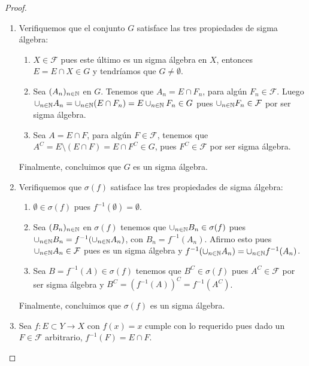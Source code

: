 \begin{proof}
  \begin{enumerate}
    \item Verifiquemos que el conjunto $G$ satisface las tres propiedades de sigma \'algebra:
      \begin{enumerate}
        \item $X \in \mathcal{F}$ pues este \'ultimo es un sigma \'algebra en $X$, entonces $E = E \cap X \in G$ y tendr\'iamos que $G \neq \emptyset$.
        \item Sea $(A_n)_{n \in \mathbb N}$ en $G$. Tenemos que $A_n = E \cap F_n$, para alg\'un $F_n \in \mathcal{F}$. Luego $\cup_{n \in \mathbb N} A_n = \cup_{n \in \mathbb N} (E \cap F_n) = E \cup_{n \in \mathbb N} F_n \in G$ pues $\cup_{n \in \mathbb N} F_n \in \mathcal{F}$ por ser sigma \'algebra.
        \item Sea $A = E \cap F$, para alg\'un $F \in \mathcal{F}$, tenemos que $A^C = E \setminus (E \cap F) = E \cap F^C \in G$, pues $F^C \in \mathcal{F}$ por ser sigma \'algebra.
      \end{enumerate}
      Finalmente, concluimos que $G$ es un sigma \'algebra.
    \item Verifiquemos que $\sigma(f)$ satisface las tres propiedades de sigma \'algebra:
      \begin{enumerate}
        \item $\emptyset \in \sigma(f)$ pues $f^{-1}(\emptyset) = \emptyset$.
        \item Sea $(B_n)_{n \in \mathbb N}$ en $\sigma(f)$ tenemos que $\cup_{n \in \mathbb N} B_n \in \sigma(f)$ pues $\cup_{n \in \mathbb N} B_n = f^{-1}(\cup_{n \in \mathbb N} A_n)$, con $B_n = f^{-1}(A_n)$. Afirmo esto pues $\cup_{n \in \mathbb N} A_n \in \mathcal{F}$ pues es un sigma \'algebra y $f^{-1}(\cup_{n \in \mathbb N} A_n) = \cup_{n \in \mathbb N} f^{-1}(A_n)$.
        \item Sea $B = f^{-1}(A) \in \sigma(f)$ tenemos que $B^C \in \sigma(f)$ pues $A^C \in \mathcal{F}$ por ser sigma \'algebra y $B^C = (f^{-1}(A))^C = f^{-1}(A^C)$.
      \end{enumerate}
      Finalmente, concluimos que $\sigma(f)$ es un sigma \'algebra.
    \item Sea $f: E \subset Y \to X$ con $f(x) = x$ cumple con lo requerido pues dado un $F \in \mathcal{F}$ arbitrario, $f^{-1}(F) = E \cap F$.
  \end{enumerate}
\end{proof}

